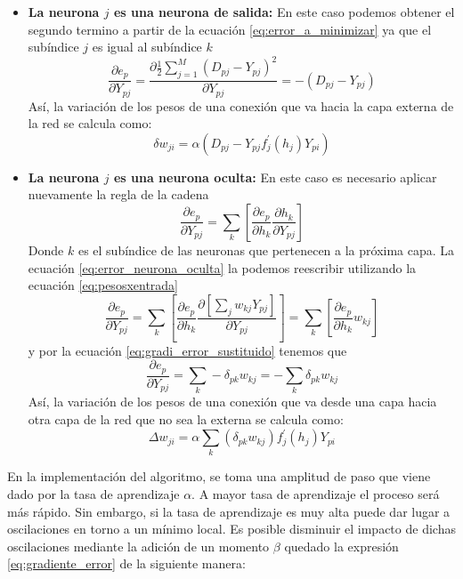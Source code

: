 \documentclass[12pt,letterpaper,oneside,openright]{book}
\begin{document}
 	\begin{itemize}
 		\item \textbf{La neurona $j$ es una neurona de salida:} En este caso podemos obtener el segundo termino a partir de la ecuación \ref{eq:error_a_minimizar} ya que el subíndice $j$ es igual al subíndice $k$
 		\begin{equation}
 			\frac{\partial e_p}{\partial Y_{pj}} = \frac{\partial \frac{1}{2} \sum_{j=1}^{M} (D_{pj} - Y_{pj})^2}{\partial Y_{pj}} = -(D_{pj} - Y_{pj})
 		\end{equation}
 		Así, la variación de los pesos de una conexión que va hacia la capa externa de la red se calcula como:
 		\begin{equation}
 			\delta w_{ji} = \alpha(D_{pj} - Y_{pj}f_{j}^{'}(h_j)Y_{pi})
 		\end{equation}
 		\item \textbf{La neurona $j$ es una neurona oculta:} En este caso es necesario aplicar nuevamente la regla de la cadena 
 		\begin{equation}
 			\label{eq:error_neurona_oculta}
 			\frac{\partial e_p}{\partial Y_{pj}} = \sum_k \left[\frac{\partial e_p}{\partial h_k}\frac{\partial h_k}{\partial Y_{pj}}\right]
 		\end{equation}
 		Donde $k$ es el subíndice de las neuronas que pertenecen a la próxima capa. La ecuación \ref{eq:error_neurona_oculta} la podemos reescribir utilizando la ecuación \ref{eq:pesosxentrada}
 		\begin{equation}
 			\frac{\partial e_p}{\partial Y_{pj}} = \sum_k \left[\frac{\partial e_p}{\partial h_k} \frac{\partial\left[\sum_j w_{kj} Y_{pj}\right]}{\partial Y_{pj}}\right] = \sum_k \left[\frac{\partial e_p}{\partial h_k} w_{kj}\right]
 		\end{equation}
 		y por la ecuación \ref{eq:gradi_error_sustituido} tenemos que
 		\begin{equation}
 			\frac{\partial e_p}{\partial Y_{pj}} = \sum_k -\delta_{pk}w_{kj} = -\sum_k \delta_{pk}w_{kj}
 		\end{equation}
 		Así, la variación de los pesos de una conexión que va desde una capa hacia otra capa de la red que no sea la externa se calcula como:
 		\begin{equation}
 			\Delta w_{ji} = \alpha \sum_k (\delta_{pk}w_{kj}) f_j^{'}(h_j)Y_{pi}
 		\end{equation}
 	\end{itemize}
 	En la implementación del algoritmo, se toma una amplitud de paso que viene dado por la tasa de aprendizaje $\alpha$. A mayor tasa de aprendizaje el proceso será más rápido. Sin embargo, si la tasa de aprendizaje es muy alta puede dar lugar a oscilaciones en torno a un mínimo local. Es posible disminuir el impacto de dichas oscilaciones mediante la adición de un momento $\beta$ quedado la expresión \ref{eq:gradiente_error} de la siguiente manera:
\end{document}
